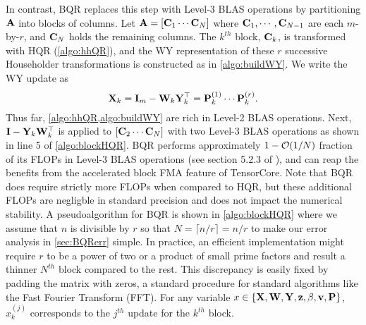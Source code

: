 In contrast, BQR replaces this step with Level-3 BLAS operations by partitioning $\mathbf{A}$ into blocks of columns.
Let $\mathbf{A} = [\mathbf{C}_1 \cdots  \mathbf{C}_N]$ where $\mathbf{C}_1,\cdots,\mathbf{C}_{N-1}$ are each $m$-by-$r$, and $\mathbf{C}_N$ holds the remaining columns.
The $k^{th}$ block, $\mathbf{C}_k$, is transformed with HQR (\cref{algo:hhQR}), and the WY representation of these $r$ successive Householder transformations is constructed as in \cref{algo:buildWY}.
We write the WY update as
\begin{equation}
	\mathbf{X}_k = \mathbf{I}_m -\mathbf{W}_{k}\mathbf{Y}_{k}^{\top} = \mathbf{P}_k^{(1)}\cdots\mathbf{P}_{k}^{(r)}.
\end{equation}
Thus far, \cref{algo:hhQR,algo:buildWY} are rich in Level-2 BLAS operations.
Next, $\mathbf{I} -\mathbf{Y}_{k}\mathbf{W}_{k}^{\top}$ is applied to $[\mathbf{C}_2 \cdots  \mathbf{C}_N]$ with two Level-3 BLAS operations as shown in line 5 of \cref{algo:blockHQR}.
BQR performs approximately $1-\mathcal{O}(1/N)$ fraction of its FLOPs in Level-3 BLAS operations (see section 5.2.3 of \cite{golub2013matrix}), and can reap the benefits from the accelerated block FMA feature of TensorCore. 
Note that BQR does require strictly more FLOPs when compared to HQR, but these additional FLOPs are negligble in standard precision and does not impact the numerical stability.
A pseudoalgorithm for BQR is shown in \cref{algo:blockHQR} where we assume that $n$ is divisible by $r$ so that $N= \lceil n/r\rceil =n/r$ to make our error analysis in \cref{sec:BQRerr} simple.
In practice, an efficient implementation might require $r$ to be a power of two or a product of small prime factors and result a thinner $N^{th}$ block compared to the rest. 
This discrepancy is easily fixed by padding the matrix with zeros, a standard procedure for standard algorithms like the Fast Fourier Transform (FFT).
For any variable $x\in\{\mathbf{X},\mathbf{W}, \mathbf{Y}, \mathbf{z}, \beta, \mathbf{v}, \mathbf{P}\}$,  $x_k^{(j)}$ corresponds to the $j^{th}$ update for the $k^{th}$ block.
